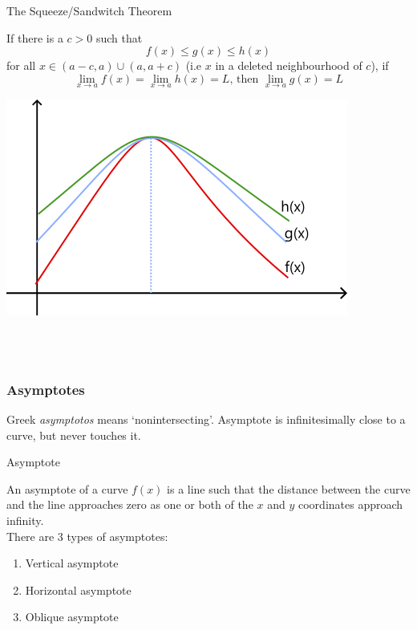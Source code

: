 \documentclass[12pt]{article}
\begin{document}
\begin{theorem}{The Squeeze/Sandwitch Theorem}
   
    If there is a $c>0$ such that \[
        f(x)\le g(x)\le h(x)
    \] for all $x\in(a-c,a)\cup(a,a+c)$ (i.e $x$ in a deleted neighbourhood of $c$), if \[
        \lim_{x \to a} f(x) = \lim_{x \to a} h(x) = L \text{, then } \lim_{x \to a} g(x) = L
    \]
    \begin{center}
        \includegraphics[scale=0.5]{SqueezeTheorem.png}
    \end{center}
\end{theorem} \\~\\



\subsubsection{Asymptotes}
Greek \textit{asymptotos} means `nonintersecting'. Asymptote is infinitesimally close to a curve, but never touches it.

\begin{definition}{Asymptote}

    An asymptote of a curve $f(x)$ is a line such that the distance between the curve and the line approaches zero as one or both of the $x$ and $y$ coordinates approach infinity. \\
    There are 3 types of asymptotes:
    \begin{enumerate}
        \item Vertical asymptote
        \item Horizontal asymptote
        \item Oblique asymptote
    \end{enumerate}
\end{definition}
\end{document}
